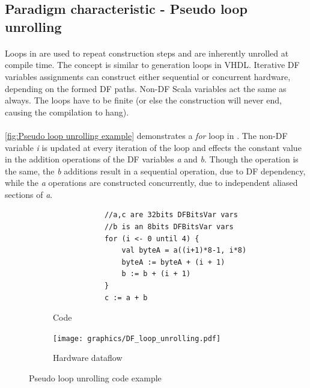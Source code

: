 \subsection{Paradigm characteristic - Pseudo loop unrolling}
\paragraph{}Loops in \cf are used to repeat construction steps and are inherently unrolled at compile time. The concept is similar to generation loops in VHDL. Iterative DF variables assignments can construct either sequential or concurrent hardware, depending on the formed DF paths. Non-DF Scala variables act the same as always. The loops have to be finite (or else the construction will never end, causing the compilation to hang).
\paragraph{}\autoref{fig:Pseudo loop unrolling example} demonstrates a \textit{for} loop in \cfns. The non-DF variable \textit{i} is updated at every iteration of the loop and effects the constant value in the addition operations of the DF variables \textit{a} and \textit{b}. Though the operation is the same, the \textit{b} additions result in a sequential operation, due to DF dependency, while the \textit{a} operations are constructed concurrently, due to independent aliased sections of \textit{a}.
\begin{figure}[h]
	\centering
	\begin{subfigure}[b]{0.49\textwidth}
		\begin{verbatim}
			//a,c are 32bits DFBitsVar vars
			//b is an 8bits DFBitsVar vars
			for (i <- 0 until 4) {
				val byteA = a((i+1)*8-1, i*8)
				byteA := byteA + (i + 1)
				b := b + (i + 1)
			}
			c := a + b
		\end{verbatim}
		\caption{Code}
		\vspace*{2mm}
	\end{subfigure}
	\hfill
	\begin{subfigure}[b]{0.44\textwidth}
		\texttt{[image: graphics/DF\_loop\_unrolling.pdf]}
		\caption{Hardware dataflow}
		\vspace*{2mm}
	\end{subfigure}
	\caption{Pseudo loop unrolling code example}\label{fig:Pseudo loop unrolling example}
\end{figure}

